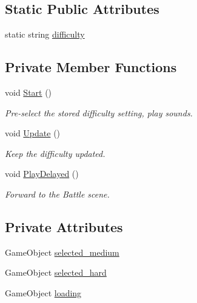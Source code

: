 \subsection*{Static Public Attributes}
\begin{DoxyCompactItemize}
\item 
static string \mbox{\hyperlink{class_bot_screen_a290ac499ce563b31c96862a68d02f562}{difficulty}}
\end{DoxyCompactItemize}
\subsection*{Private Member Functions}
\begin{DoxyCompactItemize}
\item 
void \mbox{\hyperlink{class_bot_screen_a3ffff8c4a3c08bfc13dde5e3a7af702f}{Start}} ()
\begin{DoxyCompactList}\small\item\em Pre-\/select the stored difficulty setting, play sounds. \end{DoxyCompactList}\item 
void \mbox{\hyperlink{class_bot_screen_a4a3fe27c63d7539549cd01b2f7176ed5}{Update}} ()
\begin{DoxyCompactList}\small\item\em Keep the difficulty updated. \end{DoxyCompactList}\item 
void \mbox{\hyperlink{class_bot_screen_a4d2d8d3ba5b06b185ee0ee039dbdcdd4}{Play\+Delayed}} ()
\begin{DoxyCompactList}\small\item\em Forward to the Battle scene. \end{DoxyCompactList}\end{DoxyCompactItemize}
\subsection*{Private Attributes}
\begin{DoxyCompactItemize}
\item 
Game\+Object \mbox{\hyperlink{class_bot_screen_af79faac4fee58c76b8630e8c04194b1e}{selected\+\_\+medium}}
\item 
Game\+Object \mbox{\hyperlink{class_bot_screen_a262f5baad010eaff48025e5121de8399}{selected\+\_\+hard}}
\item 
Game\+Object \mbox{\hyperlink{class_bot_screen_a233b5c70a27ea041ec3485282b95dedf}{loading}}
\end{DoxyCompactItemize}


